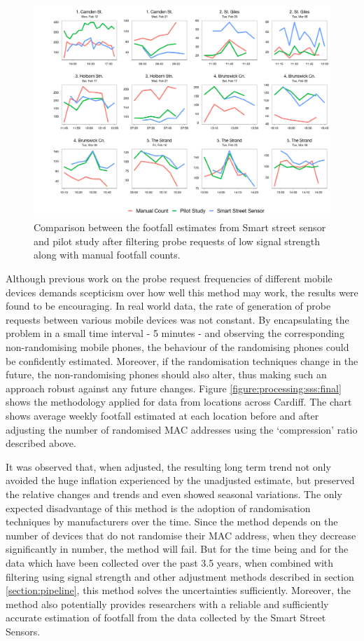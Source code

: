 \begin{figure}
  \includegraphics[trim={15 5 5 5}, clip]{images/processing-sss-compare.png}
  \caption{Comparison between the footfall estimates from Smart street sensor and pilot study after filtering probe requests of low signal strength along with manual footfall counts.}
  \label{figure:processing:sss:comparison}
\end{figure}


Although previous work on the probe request frequencies of different mobile devices demands scepticism over how well this method may work, the results were found to be encouraging.
In real world data, the rate of generation of probe requests between various mobile devices was not constant.
By encapsulating the problem in a small time interval - 5 minutes - and observing the corresponding non-randomising mobile phones, the behaviour of the randomising phones could be confidently estimated.
Moreover, if the randomisation techniques change in the future, the non-randomising phones should also alter, thus making such an approach robust against any future changes.
Figure \ref{figure:processing:sss:final} shows the methodology applied for data from locations across Cardiff.
The chart shows average weekly footfall estimated at each location before and after adjusting the number of randomised MAC addresses using the ‘compression’ ratio described above.

It was observed that, when adjusted, the resulting long term trend not only avoided the huge inflation experienced by the unadjusted estimate, but preserved the relative changes and trends and even showed seasonal variations.
The only expected disadvantage of this method is the adoption of randomisation techniques by manufacturers over the time.
Since the method depends on the number of devices that do not randomise their MAC address, when they decrease significantly in number, the method will fail.
But for the time being and for the data which have been collected over the past 3.5 years, when combined with filtering using signal strength and other adjustment methods described in section \ref{section:pipeline}, this method solves the uncertainties sufficiently.
Moreover, the method also potentially provides researchers with a reliable and sufficiently accurate estimation of footfall from the data collected by the Smart Street Sensors.

